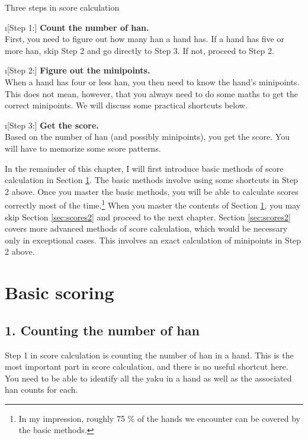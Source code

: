 \begin{itembox}[c]{Three steps in score calculation}
\begin{description}
\i[Step 1:] {\bf Count the number of {\jap han}.}\\ 
First, you need to figure out how many {\jap han} a hand has. If a hand has five or more {\jap han}, skip Step 2 and go directly to Step 3. If not, proceed to Step 2. 

\i[Step 2:] {\bf Figure out the minipoints.}\\ 
When a hand has four or less {\jap han}, you then need to know the hand's minipoints. This does not mean, however, that you always need to do some maths to get the correct minipoints. We will discuss some practical shortcuts below.

\i[Step 3:] {\bf Get the score.}\\
Based on the number of {\jap han} (and possibly minipoints), you get the score. You will have to memorize some score patterns.
\end{description}
\end{itembox}

\bigskip
In the remainder of this chapter, I will first introduce basic methods of score calculation in Section \ref{sec:scores1}. The basic methods involve using some shortcuts in Step 2 above. Once you master the basic methods, you will be able to calculate scores correctly most of the time.\footnote{In my impression, roughly 75 \% of the hands we encounter can be covered by the basic methods.} When you master the contents of Section \ref{sec:scores1}, you may skip Section \ref{sec:scores2} and proceed to the next chapter. Section \ref{sec:scores2} covers more advanced methods of score calculation, which would be necessary only in exceptional cases. This involves an exact calculation of minipoints in Step 2 above. 


\section{Basic scoring}\label{sec:scores1}

\subsection*{1. Counting the number of {\jap han}}
Step 1 in score calculation is counting the number of {\jap han} in a hand. This is the most important part in score calculation, and there is no useful shortcut here. You need to be able to identify all the {\jap yaku} in a hand as well as the associated {\jap han} counts for each. 

